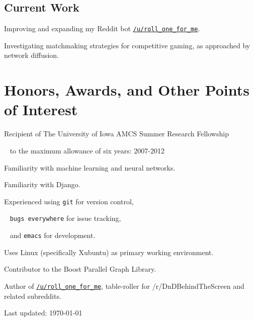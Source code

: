 \documentclass[10pt,letterpaper]{article}
\newcommand\ttt\texttt
\renewenvironment{itemize}{
  \begin{list}{}{
    \setlength{\leftmargin}{1.5em}
    \setlength{\itemsep}{0.25em}
    \setlength{\parskip}{0pt}
    \setlength{\parsep}{0.25em}
  }
}{
  \end{list}
}
\begin{document}

\subsection*{Current Work}
\begin{itemize}
\item Improving and expanding my Reddit bot \href{
  https://www.reddit.com/user/roll_one_for_me }{
  \ttt{/u/roll\_one\_for\_me}}.
\item Investigating matchmaking strategies for competitive gaming, as approached by network diffusion.
\end{itemize}


\section*{Honors, Awards, and Other Points of Interest}
\begin{itemize}
\item Recipient of The University of Iowa AMCS Summer Research
  Fellowship \par ~ to the maximum allowance of six years: 2007-2012
\item Familiarity with machine learning and neural networks.
\item Familiarity with Django.
\item Experienced using \ttt{git} for version control, \par ~ \ttt{bugs everywhere}
  for issue tracking, \par ~ and \ttt{emacs} for development.
\item Uses Linux (specifically Xubuntu) as primary working environment.
\item Contributor to the Boost Parallel Graph Library.
\item Author of \href{https://www.reddit.com/user/roll_one_for_me}{
  \ttt{/u/roll\_one\_for\_me}}, table-roller for /r/DnDBehindTheScreen and
  related subreddits.
\end{itemize}


\vfill
\begin{center}
  \begin{small}
    Last updated: \today
  \end{small}
\end{center}
\end{document}
